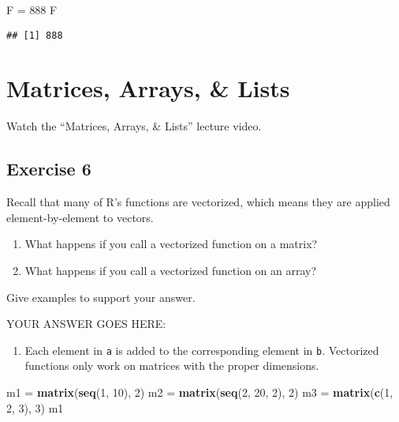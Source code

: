 \documentclass[
]{article}
\newenvironment{Shaded}{\begin{snugshade}}{\end{snugshade}}
\newcommand{\DecValTok}[1]{\textcolor[rgb]{0.00,0.00,0.81}{#1}}
\newcommand{\KeywordTok}[1]{\textcolor[rgb]{0.13,0.29,0.53}{\textbf{#1}}}
\newcommand{\NormalTok}[1]{#1}
\newcommand{\StringTok}[1]{\textcolor[rgb]{0.31,0.60,0.02}{#1}}
\providecommand{\tightlist}{%
  \setlength{\itemsep}{0pt}\setlength{\parskip}{0pt}}
\begin{document}
\begin{Shaded}
\begin{Highlighting}[]
\NormalTok{F =}\StringTok{ }\DecValTok{888}
\NormalTok{F}
\end{Highlighting}
\end{Shaded}

\begin{verbatim}
## [1] 888
\end{verbatim}

\hypertarget{matrices-arrays-lists}{%
\section{Matrices, Arrays, \& Lists}\label{matrices-arrays-lists}}

Watch the ``Matrices, Arrays, \& Lists'' lecture video.

\hypertarget{exercise-6}{%
\subsection{Exercise 6}\label{exercise-6}}

Recall that many of R's functions are vectorized, which means they are
applied element-by-element to vectors.

\begin{enumerate}
\def\labelenumi{\arabic{enumi}.}
\item
  What happens if you call a vectorized function on a matrix?
\item
  What happens if you call a vectorized function on an array?
\end{enumerate}

Give examples to support your answer.

YOUR ANSWER GOES HERE:

\begin{enumerate}
\def\labelenumi{\arabic{enumi}.}
\tightlist
\item
  Each element in \texttt{a} is added to the corresponding element in
  \texttt{b}. Vectorized functions only work on matrices with the proper
  dimensions.
\end{enumerate}

\begin{Shaded}
\begin{Highlighting}[]
\NormalTok{m1 =}\StringTok{ }\KeywordTok{matrix}\NormalTok{(}\KeywordTok{seq}\NormalTok{(}\DecValTok{1}\NormalTok{, }\DecValTok{10}\NormalTok{), }\DecValTok{2}\NormalTok{)}
\NormalTok{m2 =}\StringTok{ }\KeywordTok{matrix}\NormalTok{(}\KeywordTok{seq}\NormalTok{(}\DecValTok{2}\NormalTok{, }\DecValTok{20}\NormalTok{, }\DecValTok{2}\NormalTok{), }\DecValTok{2}\NormalTok{)}
\NormalTok{m3 =}\StringTok{ }\KeywordTok{matrix}\NormalTok{(}\KeywordTok{c}\NormalTok{(}\DecValTok{1}\NormalTok{, }\DecValTok{2}\NormalTok{, }\DecValTok{3}\NormalTok{), }\DecValTok{3}\NormalTok{)}
\NormalTok{m1}
\end{Highlighting}
\end{Shaded}
\end{document}
